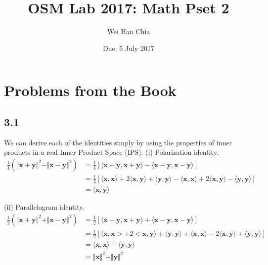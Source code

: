 \documentclass{article}
\newcommand{\inprod}[1]{\langle #1 \rangle}
\begin{document}
	\title{OSM Lab 2017: Math Pset 2}
	\author{Wei Han Chia}
	\date{Due: 5 July 2017}
	\maketitle
	
	\section*{Problems from the Book}
	\subsection*{3.1}
	We can derive each of the identities simply by using the properties of inner products in a real Inner Product Space (IPS).
	(i) Polarization identity.
	\begin{align*}
	\frac{1}{4}(\Vert \mathbf{x} + \mathbf{y} \Vert^2 - \Vert \mathbf{x} - \mathbf{y} \Vert^2) &= \frac{1}{4}[\inprod{\mathbf{x} + \mathbf{y}, \mathbf{x} + \mathbf{y}} - \inprod{\mathbf{x} - \mathbf{y}, \mathbf{x} - \mathbf{y}}] \\
	&= \frac{1}{4}[\inprod{\mathbf{x}, \mathbf{x}} + 2 \inprod{\mathbf{x}, \mathbf{y}} + \inprod{\mathbf{y}, \mathbf{y}} - \inprod{\mathbf{x}, \mathbf{x}} + 2\inprod{ \mathbf{x}, \mathbf{y}} - \inprod{\mathbf{y}, \mathbf{y}}] \\
	&= \inprod{\mathbf{x}, \mathbf{y}}
	\end{align*}
	
	(ii) Parallelogram identity.
	\begin{align*}
	\frac{1}{2}(\Vert \mathbf{x} + \mathbf{y} \Vert^2 + \Vert \mathbf{x} - \mathbf{y} \Vert^2) &= \frac{1}{2}[\inprod{\mathbf{x} + \mathbf{y}, \mathbf{x} + \mathbf{y}} + \inprod{\mathbf{x} - \mathbf{y}, \mathbf{x} - \mathbf{y}}] \\
	&= \frac{1}{2}[\inprod{\mathbf{x}, \mathbf{x}> + 2 <\mathbf{x}, \mathbf{y}} + \inprod{\mathbf{y}, \mathbf{y}} + \inprod{\mathbf{x}, \mathbf{x}} - 2\inprod{\mathbf{x}, \mathbf{y}} + \inprod{\mathbf{y}, \mathbf{y}}]\\
	&= \inprod{\mathbf{x}, \mathbf{x}} + \inprod{\mathbf{y}, \mathbf{y}} \\
	&= \Vert \mathbf{x} \Vert^2 + \Vert \mathbf{y} \Vert^2
	\end{align*}
	
\end{document}
